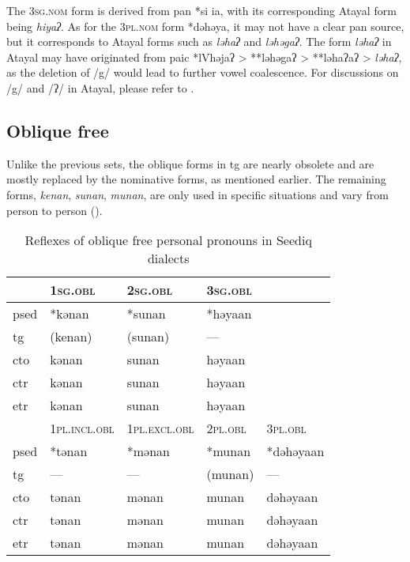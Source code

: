 The \textsc{3sg.nom} form is derived from \acs{pan} *si ia, with its corresponding Atayal form being \textit{hiyaʔ}. As for the \textsc{3pl.nom} form *dəhəya, it may not have a clear \acs{pan} source, but it corresponds to Atayal forms such as \textit{ləhaʔ} and \textit{ləhəgaʔ}. The form \textit{ləhaʔ} in Atayal may have originated from \acl{paic} *lVhəjaʔ > **ləhəgaʔ > **ləhaʔaʔ > \textit{ləhaʔ}, as the deletion of /g/ would lead to further vowel coalescence. For discussions on /g/ and /ʔ/ in Atayal, please refer to \textcite{goderich2020phd,song2023Aicgprime}. 

\subsection{Oblique free}

Unlike the previous sets, the oblique forms in \acl{tg} are nearly obsolete and are mostly replaced by the nominative forms, as mentioned earlier. The remaining forms, \textit{kenan}, \textit{sunan}, \textit{munan}, are only used in specific situations and vary from person to person (\cite{Sung2018Sedgrammar}).

\begin{table}[!htbp]
\centering
\caption{Reflexes of oblique free personal pronouns in Seediq dialects}
\label{tab:oblfree}
\begin{tabular}{lllll}
\hline
      & \textsc{1sg.obl}      & \textsc{2sg.obl}      & \textsc{3sg.obl} &           \\ \hline
\acs{psed} & *kənan       & *sunan       & *həyaan &           \\
\acs{tg}  & (kenan)      & (sunan)      & ---     &           \\
\acs{cto}  & kənan        & sunan        & həyaan  &           \\
\acs{ctr} & kənan        & sunan        & həyaan  &           \\
\acs{etr} & kənan        & sunan        & həyaan  &           \\ \hline
      & \textsc{1pl.incl.obl} & \textsc{1pl.excl.obl} & \textsc{2pl.obl} & \textsc{3pl.obl}   \\ \hline
\acs{psed} & *tənan       & *mənan       & *munan  & *dəhəyaan \\
\acs{tg}  & ---          & ---          & (munan) & ---       \\
\acs{cto}  & tənan        & mənan        & munan   & dəhəyaan  \\
\acs{ctr} & tənan        & mənan        & munan   & dəhəyaan  \\
\acs{etr} & tənan        & mənan        & munan   & dəhəyaan  \\ \hline
\end{tabular}
\end{table}


